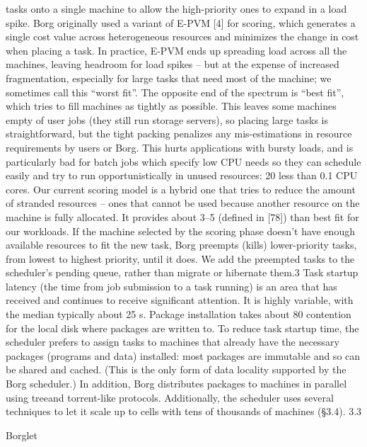 tasks onto a single machine to allow the high-priority ones
to expand in a load spike.
Borg originally used a variant of E-PVM [4] for scoring,
which generates a single cost value across heterogeneous
resources and minimizes the change in cost when placing
a task. In practice, E-PVM ends up spreading load across
all the machines, leaving headroom for load spikes – but at
the expense of increased fragmentation, especially for large
tasks that need most of the machine; we sometimes call this
“worst fit”.
The opposite end of the spectrum is “best fit”, which tries
to fill machines as tightly as possible. This leaves some machines empty of user jobs (they still run storage servers), so
placing large tasks is straightforward, but the tight packing
penalizes any mis-estimations in resource requirements by
users or Borg. This hurts applications with bursty loads, and
is particularly bad for batch jobs which specify low CPU
needs so they can schedule easily and try to run opportunistically in unused resources: 20%
less than 0.1 CPU cores.
Our current scoring model is a hybrid one that tries to
reduce the amount of stranded resources – ones that cannot
be used because another resource on the machine is fully
allocated. It provides about 3–5%
(defined in [78]) than best fit for our workloads.
If the machine selected by the scoring phase doesn’t have
enough available resources to fit the new task, Borg preempts
(kills) lower-priority tasks, from lowest to highest priority,
until it does. We add the preempted tasks to the scheduler’s
pending queue, rather than migrate or hibernate them.3
Task startup latency (the time from job submission to
a task running) is an area that has received and continues
to receive significant attention. It is highly variable, with
the median typically about 25 s. Package installation takes
about 80%
contention for the local disk where packages are written to.
To reduce task startup time, the scheduler prefers to assign
tasks to machines that already have the necessary packages
(programs and data) installed: most packages are immutable
and so can be shared and cached. (This is the only form of
data locality supported by the Borg scheduler.) In addition,
Borg distributes packages to machines in parallel using treeand torrent-like protocols.
Additionally, the scheduler uses several techniques to let
it scale up to cells with tens of thousands of machines (§3.4).
3.3

Borglet

